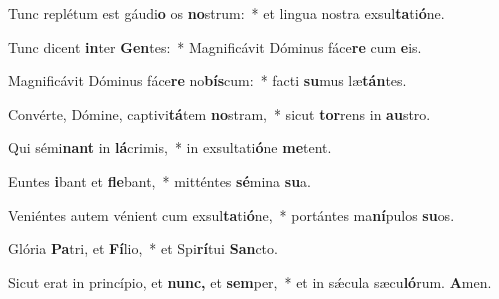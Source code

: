 \item Tunc replétum est gáudi\textbf{o} os \textbf{no}strum:~* et lingua nostra exsul\textbf{ta}ti\textbf{ó}ne.
\item Tunc dicent \textbf{in}ter \textbf{Gen}tes:~* Magnificávit Dóminus fáce\textbf{re} cum \textbf{e}is.
\item Magnificávit Dóminus fáce\textbf{re} no\textbf{bís}cum:~* facti \textbf{su}mus læ\textbf{tán}tes.
\item Convérte, Dómine, captivi\textbf{tá}tem \textbf{no}stram,~* sicut \textbf{tor}rens in \textbf{au}stro.
\item Qui sémi\textbf{nant} in \textbf{lá}crimis,~* in exsultati\textbf{ó}ne \textbf{me}tent.
\item Euntes \textbf{i}bant et \textbf{fle}bant,~* mitténtes \textbf{sé}mina \textbf{su}a.
\item Veniéntes autem vénient cum exsul\textbf{ta}ti\textbf{ó}ne,~* portántes ma\textbf{ní}pulos \textbf{su}os.
\item Glória \textbf{Pa}tri, et \textbf{Fí}lio,~* et Spi\textbf{rí}tui \textbf{San}cto.
\item Sicut erat in princípio, et \textbf{nunc,} et \textbf{sem}per,~* et in sǽcula sæcu\textbf{ló}rum. \textbf{A}men.
